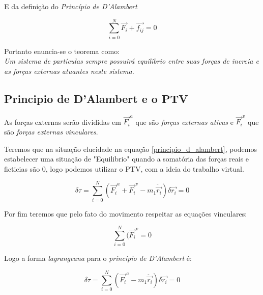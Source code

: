 E da definição do \textit{Princípio de D'Alambert}

\begin{equation}
\sum_{i=0}^N \vec{F_{i}} + \vec{f_{ij}} = 0
\label{principio_d_alambert}
\end{equation}


Portanto enuncia-se o teorema como:\\
\textit{Um sistema de partículas sempre possuirá equilibrio entre suas forças de inercia e as forças externas atuantes neste sistema.}

\subsection{Principio de D'Alambert e o PTV}

As forças externas serão divididas em $\vec{F_i}^a$ que são \textit{forças externas ativas} e $\vec{F_i}^v$ que são \textit{forças externas vinculares}.

Teremos que na situação elucidade na equação \ref{principio_d_alambert}, podemos estabelecer uma situação de "Equilibrio" quando a somatória das forças reais e ficticias são 0, logo podemos utilizar o PTV, com a ideia do trabalho virtual.

\begin{equation}
		\delta \tau = \sum_{i=0}^N (\vec{F_i}^a + \vec{F_i}^v - m_1\ddot{\vec{r_i}})\delta \vec{r_i} = 0
\end{equation}

Por fim teremos que pelo fato do movimento respeitar as equações vinculares:

\begin{equation}
	\sum_{i=0}^N (\vec{F_i}^v = 0
\end{equation}

Logo a forma \textit{lagrangeana} para o \textit{princípio de D'Alambert} é:

\begin{equation}
		\delta \tau = \sum_{i=0}^N (\vec{F_i}^a - m_1\ddot{\vec{r_i}})\delta \vec{r_i} = 0
\end{equation}

